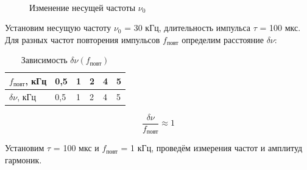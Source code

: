 \documentclass[a4paper, 12pt]{article}
\begin{document}
\begin{figure}[h!]
	\centering
	\\
\caption{Изменение несущей частоты $\nu_0$}
\end{figure}

\newpage
Установим несущую частоту $\nu_0$ = 30 кГц, длительность импульса $\tau$ = 100 мкс. Для разных частот повторения импульсов $f_\text{повт}$ определим расстояние $\delta \nu$:

\begin{table}[h!]
\centering
\caption{Зависимость $\delta \nu(f_\text{повт})$}
\begin{tabular}{|l|l|l|l|l|l|}
\hline
$f_\text{повт}$, кГц  & 0,5 & 1 & 2 & 4 & 5 \\ \hline
$\delta \nu$, кГц & 0,5 & 1 & 2 & 4 & 5 \\ \hline
\end{tabular}
\end{table}

\[\dfrac{\delta \nu}{f_\text{повт}} \approx 1\]

Установим $\tau$ = 100 мкс и $f_\text{повт}$ = 1 кГц, проведём измерения частот и амплитуд гармоник.
\end{document}
